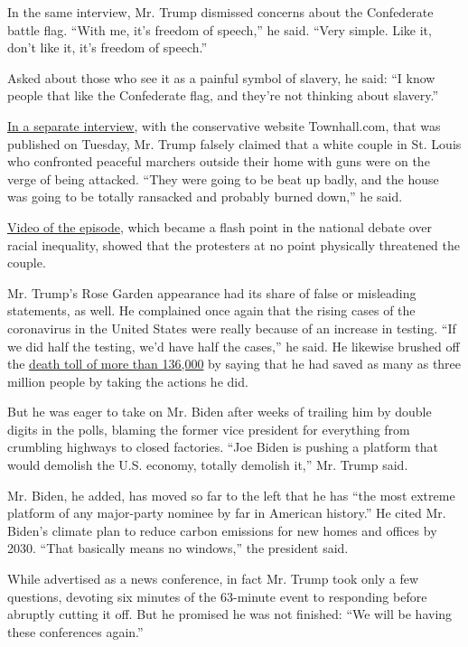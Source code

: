In the same interview, Mr. Trump dismissed concerns about the
Confederate battle flag. ``With me, it's freedom of speech,'' he said.
``Very simple. Like it, don't like it, it's freedom of speech.''

Asked about those who see it as a painful symbol of slavery, he said:
``I know people that like the Confederate flag, and they're not thinking
about slavery.''

\href{https://www.youtube.com/watch?v=70Jzf0NhBv8}{In a separate
interview}, with the conservative website Townhall.com, that was
published on Tuesday, Mr. Trump falsely claimed that a white couple in
St. Louis who confronted peaceful marchers outside their home with guns
were on the verge of being attacked. ``They were going to be beat up
badly, and the house was going to be totally ransacked and probably
burned down,'' he said.

\href{https://www.nytimes.com/video/us/politics/100000007214585/trump-white-couple-guns-st-louis.html}{Video
of the episode}, which became a flash point in the national debate over
racial inequality, showed that the protesters at no point physically
threatened the couple.

Mr. Trump's Rose Garden appearance had its share of false or misleading
statements, as well. He complained once again that the rising cases of
the coronavirus in the United States were really because of an increase
in testing. ``If we did half the testing, we'd have half the cases,'' he
said. He likewise brushed off the
\href{https://www.nytimes.com/interactive/2020/us/coronavirus-us-cases.html}{death
toll of more than 136,000} by saying that he had saved as many as three
million people by taking the actions he did.

But he was eager to take on Mr. Biden after weeks of trailing him by
double digits in the polls, blaming the former vice president for
everything from crumbling highways to closed factories. ``Joe Biden is
pushing a platform that would demolish the U.S. economy, totally
demolish it,'' Mr. Trump said.

Mr. Biden, he added, has moved so far to the left that he has ``the most
extreme platform of any major-party nominee by far in American
history.'' He cited Mr. Biden's climate plan to reduce carbon emissions
for new homes and offices by 2030. ``That basically means no windows,''
the president said.

While advertised as a news conference, in fact Mr. Trump took only a few
questions, devoting six minutes of the 63-minute event to responding
before abruptly cutting it off. But he promised he was not finished:
``We will be having these conferences again.''

